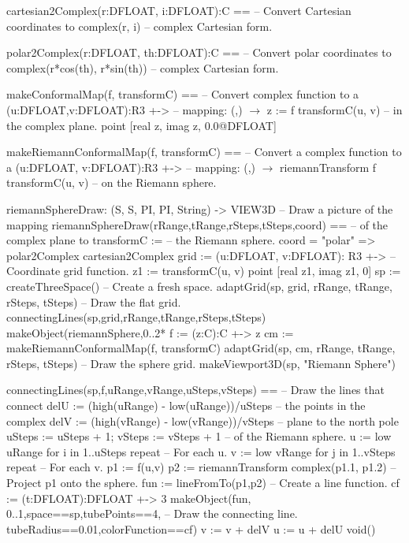 \begin{xmpLinesNoResetPlain}
cartesian2Complex(r:DFLOAT, i:DFLOAT):C ==               -- Convert Cartesian coordinates to
  complex(r, i)                                          -- \quad{}complex Cartesian form.

polar2Complex(r:DFLOAT, th:DFLOAT):C ==                  -- Convert polar coordinates to
  complex(r*cos(th), r*sin(th))                          -- \quad{}complex Cartesian form.

makeConformalMap(f, transformC) ==                       -- Convert complex function  to a
  (u:DFLOAT,v:DFLOAT):R3 +->                             -- \quad{}mapping: (,) $\to$ 
    z := f transformC(u, v)                              -- \quad{}in the complex plane.
    point [real z, imag z, 0.0@DFLOAT]

makeRiemannConformalMap(f, transformC) ==                -- Convert a complex function  to a
  (u:DFLOAT, v:DFLOAT):R3 +->                            -- \quad{}mapping: (,) $\to$ 
    riemannTransform f transformC(u, v)                  -- \quad{}on the Riemann sphere.

riemannSphereDraw: (S, S, PI, PI, String) -> VIEW3D      -- Draw a picture of the mapping
riemannSphereDraw(rRange,tRange,rSteps,tSteps,coord) ==  -- \quad{}of the complex plane to
  transformC :=                                          -- \quad{}the Riemann sphere.
    coord = "polar" => polar2Complex
    cartesian2Complex
  grid := (u:DFLOAT, v:DFLOAT): R3 +->                   -- Coordinate grid function.
    z1 := transformC(u, v)
    point [real z1, imag z1, 0]
  sp := createThreeSpace()                               -- Create a fresh space.
  adaptGrid(sp, grid, rRange, tRange, rSteps, tSteps)    -- Draw the flat grid.
  connectingLines(sp,grid,rRange,tRange,rSteps,tSteps)
  makeObject(riemannSphere,0..2*%
  f := (z:C):C +-> z
  cm := makeRiemannConformalMap(f, transformC)
  adaptGrid(sp, cm, rRange, tRange, rSteps, tSteps)      -- Draw the sphere grid.
  makeViewport3D(sp, "Riemann Sphere")

connectingLines(sp,f,uRange,vRange,uSteps,vSteps) ==     -- Draw the lines that connect
  delU := (high(uRange) - low(uRange))/uSteps            -- \quad{}the points in the complex
  delV := (high(vRange) - low(vRange))/vSteps            -- \quad{}plane to the north pole
  uSteps := uSteps + 1; vSteps := vSteps + 1             -- \quad{}of the Riemann sphere.
  u := low uRange
  for i in 1..uSteps repeat                              -- For each u.
    v := low vRange
    for j in 1..vSteps repeat                            -- For each v.
      p1 := f(u,v)
      p2 := riemannTransform complex(p1.1, p1.2)         -- Project p1 onto the sphere.
      fun := lineFromTo(p1,p2)                           -- Create a line function.
      cf := (t:DFLOAT):DFLOAT +-> 3
      makeObject(fun, 0..1,space==sp,tubePoints==4,      -- Draw the connecting line.
                 tubeRadius==0.01,colorFunction==cf)
      v := v + delV
    u := u + delU
  void()


\end{xmpLinesNoResetPlain}
